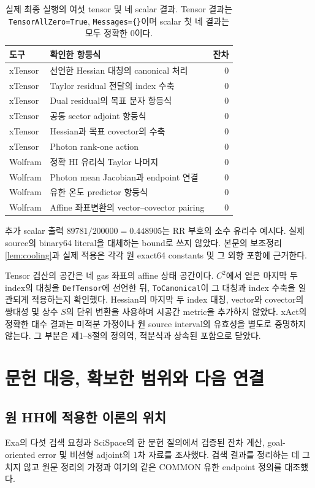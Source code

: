 \begin{table}[H]
\centering\small
\begin{tabularx}{\textwidth}{@{}p{17mm}X r@{}}
\toprule
도구 & 확인한 항등식 & 잔차\\\midrule
xTensor & 선언한 Hessian 대칭의 canonical 처리 & 0\\
xTensor & Taylor residual 전달의 index 수축 & 0\\
xTensor & Dual residual의 목표 분자 항등식 & 0\\
xTensor & 공통 sector adjoint 항등식 & 0\\
xTensor & Hessian과 목표 covector의 수축 & 0\\
xTensor & Photon rank-one action & 0\\\midrule
Wolfram & 정확 HI 유리식 Taylor 나머지 & 0\\
Wolfram & Photon mean Jacobian과 endpoint 연결 & 0\\
Wolfram & 유한 온도 predictor 항등식 & 0\\
Wolfram & Affine 좌표변환의 vector--covector pairing & 0\\
\bottomrule
\end{tabularx}
\caption{실제 최종 실행의 여섯 tensor 및 네 scalar 결과. Tensor 결과는 \texttt{TensorAllZero=True}, \texttt{Messages=\{\}}이며 scalar 첫 네 결과는 모두 정확한 0이다.}
\label{tab:xact}
\end{table}

추가 scalar 출력 $89781/200000=0.448905$는 RR 부호의 소수 유리수 예시다. 실제 source의 binary64 literal을 대체하는 bound로 쓰지 않았다. 본문의 보조정리 \ref{lem:cooling}과 실제 적용은 각각 원 exact64 constants 및 그 외향 포함에 근거한다.

Tensor 검산의 공간은 네 gas 좌표의 affine 상태 공간이다. $C^2$에서 얻은 마지막 두 index의 대칭을 \texttt{DefTensor}에 선언한 뒤, \texttt{ToCanonical}이 그 대칭과 index 수축을 일관되게 적용하는지 확인했다. Hessian의 마지막 두 index 대칭, vector와 covector의 쌍대성 및 상수 $S$의 단위 변환을 사용하며 시공간 metric을 추가하지 않았다. xAct의 정확한 대수 결과는 미적분 가정이나 원 source interval의 유효성을 별도로 증명하지 않는다. 그 부분은 제1--8절의 정의역, 적분식과 상속된 포함으로 닫았다.

\section{문헌 대응, 확보한 범위와 다음 연결}\label{sec:literature}
\subsection{원 HH에 적용한 이론의 위치}
Exa의 다섯 검색 요청과 SciSpace의 한 문헌 질의에서 검증된 잔차 계산, goal-oriented error 및 비선형 adjoint의 1차 자료를 조사했다. 검색 결과를 정리하는 데 그치지 않고 원문 정리의 가정과 여기의 같은 COMMON 유한 endpoint 정의를 대조했다.\cite{lit16}

